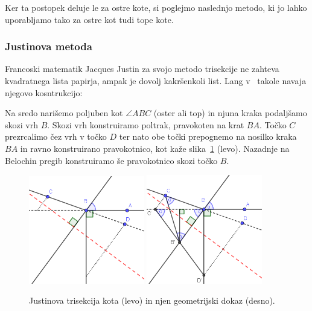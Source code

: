 Ker ta postopek deluje le za ostre kote, si poglejmo naslednjo metodo, ki jo lahko uporabljamo tako za ostre kot tudi tope kote.

\subsubsection*{Justinova metoda}

Francoski matematik Jacques Justin za svojo metodo trisekcije ne zahteva kvadratnega lista papirja, ampak je dovolj kakršenkoli list. Lang v~\cite[str.\ 34]{lang2013} takole navaja njegovo kosntrukcijo:

Na sredo narišemo poljuben kot $\angle ABC$ (oster ali top) in njuna kraka podaljšamo skozi vrh $B$. Skozi vrh konstruiramo poltrak, pravokoten na krat $BA$. Točko $C$ prezrcalimo čez vrh v točko $D$ ter nato obe točki prepognemo na nosilko kraka $BA$ in ravno konstruirano pravokotnico, kot kaže slika~\ref{fig:justin} (levo). Nazadnje na Belochin pregib konstruiramo še pravokotnico skozi točko $B$.
\begin{figure}[h]
    \centering
    \includegraphics[width=0.45\textwidth]{images/starogr_problemi/justin_trisection.png}
    \includegraphics[width=0.45\textwidth]{images/starogr_problemi/justin_trisection_dokaz.png}
    \caption[Justinova trisekcija kota]{Justinova trisekcija kota (levo) in njen geometrijski dokaz (desno).}
    \label{fig:justin}
\end{figure}

